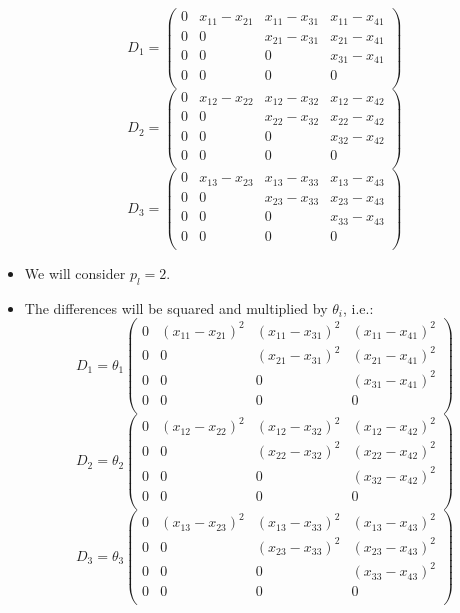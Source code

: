 \documentclass[
  letterpaper,
  DIV=11,
  numbers=noendperiod]{scrreprt}
\begin{document}
\begin{itemize}
  \[D_1 = \begin{pmatrix} 0 & x_{11} - x_{21} & x_{11} -x_{31} & x_{11} - x_{41} \\  0 &  0 & x_{21} -x_{31} & x_{21} - x_{41} \\ 0 & 0 & 0 & x_{31} - x_{41} \\ 0 & 0 & 0 & 0 \\\end{pmatrix}\]
  \[ D_2 = \begin{pmatrix} 0 & x_{12} - x_{22} & x_{12} -x_{32} & x_{12} - x_{42} \\  0 & 0 & x_{22} -x_{32} & x_{22} - x_{42} \\ 0 & 0 & 0 & x_{32} - x_{42} \\ 0 & 0 & 0 & 0 \\\end{pmatrix}\]
  \[ D_3 = \begin{pmatrix} 0 & x_{13} - x_{23} & x_{13} -x_{33} & x_{13} - x_{43} \\  0 & 0 & x_{23} -x_{33} & x_{23} - x_{43} \\ 0 & 0 & 0 & x_{33} - x_{43} \\ 0 & 0 & 0 & 0 \\\end{pmatrix}\]
\item
  We will consider \(p_l=2\).
\item
  The differences will be squared and multiplied by \(\theta_i\), i.e.:
  \[ D_1 = \theta_1 \begin{pmatrix} 0 & (x_{11} - x_{21})^2 & (x_{11} -x_{31})^2 & (x_{11} - x_{41})^2 \\  0 &  0 & (x_{21} -x_{31})^2 & (x_{21} - x_{41})^2 \\ 0 & 0 & 0 & (x_{31} - x_{41})^2 \\ 0 & 0 & 0 & 0 \\\end{pmatrix}\]
  \[ D_2 = \theta_2 \begin{pmatrix} 0 & (x_{12} - x_{22})^2 & (x_{12} -x_{32})^2 & (x_{12} - x_{42})^2 \\  0 & 0 & (x_{22} -x_{32})^2 & (x_{22} - x_{42})^2 \\ 0 & 0 & 0 & (x_{32} - x_{42})^2 \\ 0 & 0 & 0 & 0 \\\end{pmatrix}\]
  \[ D_3 = \theta_3 \begin{pmatrix} 0 & (x_{13} - x_{23})^2 & (x_{13} -x_{33})^2 & (x_{13} - x_{43})^2 \\  0 & 0 & (x_{23} -x_{33})^2 & (x_{23} - x_{43})^2 \\ 0 & 0 & 0 & (x_{33} - x_{43})^2 \\ 0 & 0 & 0 & 0 \\\end{pmatrix}\]

\end{itemize}
\end{document}
